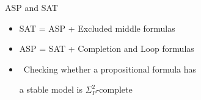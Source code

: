 \begin{frame}{ASP and SAT}
  \bigskip
  \begin{itemize}
  \item<2-> SAT = {ASP + {Excluded middle formulas} %
      }
    \medskip
  \item<2-> ASP = {SAT + {Completion and Loop formulas}}
    \bigskip
    \bigskip
  \item<4->  \
    Checking whether a propositional formula has\par a stable model is $\Sigma^2_P$-complete
  \end{itemize}
\end{frame}
%

